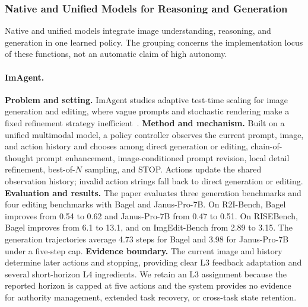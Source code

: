 \subsubsection{Native and Unified Models for Reasoning and Generation}
Native and unified models integrate image understanding, reasoning, and generation in one learned policy. The grouping concerns the implementation locus of these functions, not an automatic claim of high autonomy.

\paragraph{ImAgent.}
\textbf{Problem and setting.} ImAgent studies adaptive test-time scaling for image generation and editing, where vague prompts and stochastic rendering make a fixed refinement strategy inefficient~\cite{avg251111483}. \textbf{Method and mechanism.} Built on a unified multimodal model, a policy controller observes the current prompt, image, and action history and chooses among direct generation or editing, chain-of-thought prompt enhancement, image-conditioned prompt revision, local detail refinement, best-of-$N$ sampling, and STOP. Actions update the shared observation history; invalid action strings fall back to direct generation or editing. \textbf{Evaluation and results.} The paper evaluates three generation benchmarks and four editing benchmarks with Bagel and Janus-Pro-7B. On R2I-Bench, Bagel improves from 0.54 to 0.62 and Janus-Pro-7B from 0.47 to 0.51. On RISEBench, Bagel improves from 6.1 to 13.1, and on ImgEdit-Bench from 2.89 to 3.15. The generation trajectories average 4.73 steps for Bagel and 3.98 for Janus-Pro-7B under a five-step cap. \textbf{Evidence boundary.} The current image and history determine later actions and stopping, providing clear L3 feedback adaptation and several short-horizon L4 ingredients. We retain an L3 assignment because the reported horizon is capped at five actions and the system provides no evidence for authority management, extended task recovery, or cross-task state retention.

